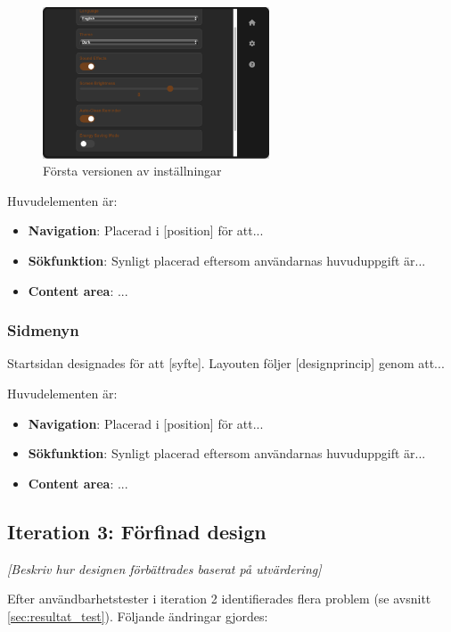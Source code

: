 \begin{figure}[H]
    \centering
    \includegraphics[width=0.6\textwidth]{bilder/settings.png}
    \caption{Första versionen av inställningar }
    \label{fig:settings_v1}
\end{figure}

Huvudelementen är:
\begin{itemize}
    \item \textbf{Navigation}: Placerad i [position] för att...
    \item \textbf{Sökfunktion}: Synligt placerad eftersom användarnas huvuduppgift är...
    \item \textbf{Content area}: ...
\end{itemize}

\subsubsection{Sidmenyn}

Startsidan designades för att [syfte]. Layouten följer [designprincip] genom att...

Huvudelementen är:
\begin{itemize}
    \item \textbf{Navigation}: Placerad i [position] för att...
    \item \textbf{Sökfunktion}: Synligt placerad eftersom användarnas huvuduppgift är...
    \item \textbf{Content area}: ...
\end{itemize}
\subsection{Iteration 3: Förfinad design}

\textit{[Beskriv hur designen förbättrades baserat på utvärdering]}

Efter användbarhetstester i iteration 2 identifierades flera problem (se avsnitt \ref{sec:resultat_test}). Följande ändringar gjordes:

